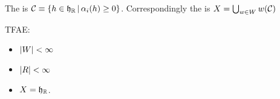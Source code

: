 \documentclass{article}
\begin{document}
\begin{definition}
The  is $\mathcal{C} \equiv \left\{ h \in \mathfrak{h}_{\mathbb{R}} \, | \, \alpha_i(h) \geq 0 \right\}$. Correspondingly the  is $X = \bigcup_{w \in W} w(\mathcal{C})$
\end{definition}

\begin{prop}
TFAE:
\begin{itemize}
    \item $\left\lvert W \right\rvert < \infty $
    \item $\left\lvert R \right\rvert < \infty$ 
    \item $X = \mathfrak{h}_{\mathbb{R}}$. 
\end{itemize}
\end{prop}


\end{document}
